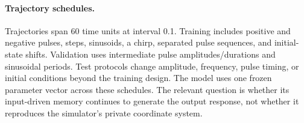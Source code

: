 \paragraph{Trajectory schedules.}
Trajectories span 60 time units at interval 0.1. Training includes positive and
negative pulses, steps, sinusoids, a chirp, separated pulse sequences, and
initial-state shifts. Validation uses intermediate pulse amplitudes/durations
and sinusoidal periods. Test protocols change amplitude, frequency, pulse
timing, or initial conditions beyond the training design. The model uses one
frozen parameter vector across these schedules. The relevant question is
whether its input-driven memory continues to generate the output response,
not whether it reproduces the simulator's private coordinate system.
